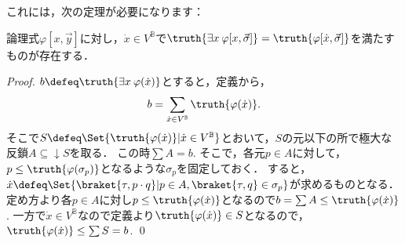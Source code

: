\documentclass[a4j]{ltjsarticle}
\begin{document}
これには，次の定理が必要になります：

\begin{theorem}[極大原理]
 論理式$\varphi[x, \vec{y}]$に対し，$\dot{x} \in V^{\mathbb{B}}$で$\truth{\exists x \: \varphi[x, \vec{\sigma}]} = \truth{\varphi[\dot{x}, \vec{\sigma}]}$を満たすものが存在する．
\end{theorem}
\begin{proof}
 $b \defeq \truth{\exists x \: \varphi(\dot{x})}$とすると，定義から，
 \[
  b = \sum_{\dot{x} \in V^\mathbb{B}} \truth{\varphi(\dot{x})}.
 \]
 そこで$S \defeq \Set{ \truth{\varphi(\dot{x})} | \dot{x} \in V^{\mathbb{B}}}$とおいて，$S$の元以下の所で極大な反鎖$A \subseteq \mathop{\downarrow} S$を取る．
 この時$\sum A = b$.
 そこで，各元$p \in A$に対して，$p \leq \truth{\varphi(\sigma_p)}$となるような$\sigma_p$を固定しておく．
すると，$\dot{x} \defeq \Set{\braket{\tau, p \cdot q} | p \in A, \braket{\tau, q} \in \sigma_p}$が求めるものとなる．
 定め方より各$p \in A$に対し$p \leq \truth{\varphi(\dot{x})}$となるので$b = \sum A \leq \truth{\varphi(\dot{x})}$.
 一方で$\dot{x} \in V^{\mathbb{B}}$なので定義より$\truth{\varphi(\dot{x})} \in S$となるので，$\truth{\varphi(\dot{x})} \leq \sum S = b$. \qed
\end{proof}
\end{document}
